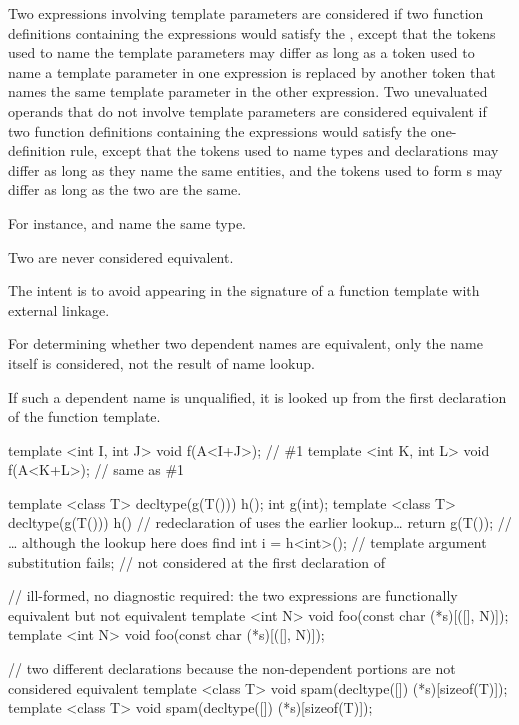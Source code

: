 \pnum
{}%
Two expressions involving template parameters are considered
if two function definitions containing the expressions would satisfy
the , except that the tokens used
to name the template parameters may differ as long as a token used to
name a template parameter in one expression is replaced by another token
that names the same template parameter in the other expression.
Two unevaluated operands that do not involve template parameters
are considered equivalent
if two function definitions containing the expressions
would satisfy the one-definition rule,
except that the tokens used to name types and declarations may differ
as long as they name the same entities, and
the tokens used to form s may differ
as long as the two  are the same.
\begin{note}
For instance,  and  name the same type.
\end{note}
Two  are never considered equivalent.
\begin{note}
The intent is to avoid  appearing in the
signature of a function template with external linkage.
\end{note}
For determining whether two dependent names are equivalent,
only the name itself is considered, not the result of name lookup.
\begin{note}
If such a dependent name is unqualified,
it is looked up from
the first declaration of the function template.
\end{note}
\begin{example}
\begin{codeblock}
template <int I, int J> void f(A<I+J>);         // \#1
template <int K, int L> void f(A<K+L>);         // same as \#1

template <class T> decltype(g(T())) h();
int g(int);
template <class T> decltype(g(T())) h()         // redeclaration of  uses the earlier lookup\ldots
  { return g(T()); }                            // \ldots{} although the lookup here does find 
int i = h<int>();                               // template argument substitution fails; 
                                                // not considered at the first declaration of 

// ill-formed, no diagnostic required: the two expressions are functionally equivalent but not equivalent
template <int N> void foo(const char (*s)[([]{}, N)]);
template <int N> void foo(const char (*s)[([]{}, N)]);

// two different declarations because the non-dependent portions are not considered equivalent
template <class T> void spam(decltype([]{}) (*s)[sizeof(T)]);
template <class T> void spam(decltype([]{}) (*s)[sizeof(T)]);
\end{codeblock}
\end{example}
